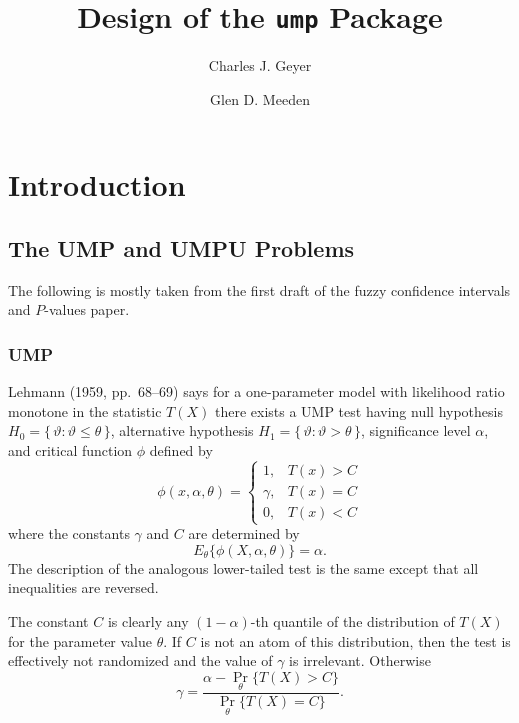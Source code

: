 \documentclass{article}
\newcommand{\set}[1]{\{\, #1 \,\}}
\DeclareMathOperator{\pr}{Pr}
\begin{document}
\title{Design of the \texttt{ump} Package}
\author{Charles J. Geyer \and Glen D. Meeden}
\maketitle

\section{Introduction}

\subsection{The UMP and UMPU Problems}

The following is mostly taken from the first draft of the fuzzy confidence
intervals and $P$-values paper.

\subsubsection{UMP}

Lehmann (1959, pp.~68--69) says for a one-parameter
model with likelihood ratio monotone in the statistic $T(X)$
there exists a UMP test
having null hypothesis $H_0 = \set{ \vartheta : \vartheta \le \theta }$,
alternative hypothesis $H_1 = \set{ \vartheta : \vartheta > \theta }$,
significance level $\alpha$,
and critical function $\phi$ defined by
\begin{equation} \label{eq:ump-crit}
   \phi(x, \alpha, \theta)
   =
   \begin{cases}
   1, & T(x) > C
   \\
   \gamma, & T(x) = C
   \\
   0, & T(x) < C
   \end{cases}
\end{equation}
where the constants $\gamma$ and $C$ are determined by
$$
   E_\theta\{\phi(X, \alpha, \theta)\} = \alpha.
$$
The description of the analogous lower-tailed test is
the same except that all inequalities are reversed.

The constant $C$ is clearly any $(1 - \alpha)$-th quantile of the distribution
of $T(X)$ for the parameter value $\theta$.
If $C$ is not an atom of this distribution, then
the test is effectively not randomized and the value of $\gamma$ is
irrelevant.  Otherwise
\begin{equation} \label{eq:gamma-ump}
   \gamma = \frac{\alpha - \pr_\theta\{T(X) > C\}}{\pr_\theta\{T(X) = C\}}.
\end{equation}
\end{document}
